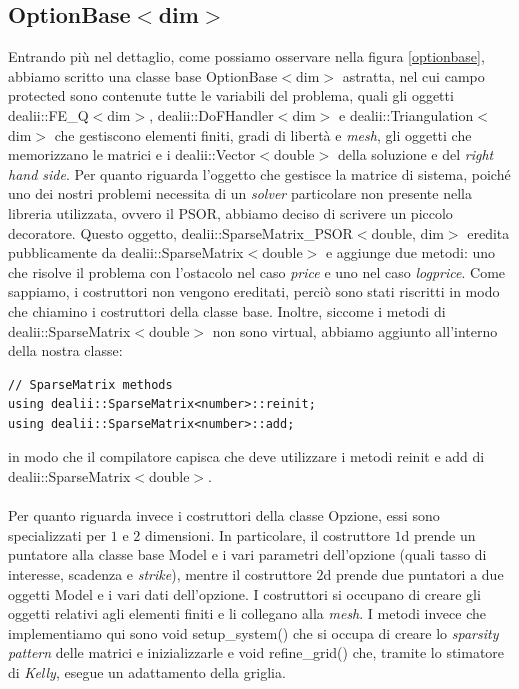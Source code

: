 \documentclass[a4paper,10pt]{report}
\theoremstyle{plain}
\theoremstyle{definition}
\theoremstyle{remark}
\begin{document}
\subsection{\textsf{OptionBase$<$dim$>$}}
Entrando pi\`u nel dettaglio, come possiamo osservare nella figura \ref{optionbase}, abbiamo scritto una classe base \textsf{OptionBase$<$dim$>$} astratta, nel cui campo \textsf{protected} sono contenute tutte le variabili del problema, quali gli oggetti \textsf{dealii::FE\_Q$<$dim$>$}, \textsf{dealii::DoFHandler$<$dim$>$} e \textsf{dealii::Triangulation$<$dim$>$} che gestiscono elementi finiti, gradi di libert\`a e \emph{mesh}, gli oggetti che memorizzano le matrici e i \textsf{dealii::Vector$<$double$>$} della soluzione e del \emph{right hand side}. Per quanto riguarda l'oggetto che gestisce la matrice di sistema, poich\'e uno dei nostri problemi necessita di un \emph{solver} particolare non presente nella libreria utilizzata, ovvero il PSOR, abbiamo deciso di scrivere un piccolo decoratore. Questo oggetto, \textsf{dealii::SparseMatrix\_PSOR$<$double, dim$>$} eredita pubblicamente da \textsf{dealii::SparseMatrix$<$double$>$} e aggiunge due metodi: uno che risolve il problema con l'ostacolo nel caso \emph{price} e uno nel caso \emph{logprice}. Come sappiamo, i costruttori non vengono ereditati, perci\`o sono stati riscritti in modo che chiamino i costruttori della classe base. Inoltre, siccome i metodi di \textsf{dealii::SparseMatrix$<$double$>$} non sono \textsf{virtual}, abbiamo aggiunto all'interno della nostra classe:
\begin{lstlisting}
// SparseMatrix methods
using dealii::SparseMatrix<number>::reinit;
using dealii::SparseMatrix<number>::add;
\end{lstlisting}
in modo che il compilatore capisca che deve utilizzare i metodi \textsf{reinit} e \textsf{add} di \textsf{dealii::SparseMatrix$<$double$>$}.\\\\Per quanto riguarda invece i costruttori della classe Opzione, essi sono specializzati per $1$ e $2$ dimensioni. In particolare, il costruttore $1$d prende un puntatore alla classe base \textsf{Model} e i vari parametri dell'opzione (quali tasso di interesse, scadenza e \emph{strike}), mentre il costruttore $2$d prende due puntatori a due oggetti \textsf{Model} e i vari dati dell'opzione. I costruttori si occupano di creare gli oggetti relativi agli elementi finiti e li collegano alla \emph{mesh}. I metodi invece che implementiamo qui sono \textsf{void setup\_system()} che si occupa di creare lo \emph{sparsity pattern} delle matrici e inizializzarle e \textsf{void refine\_grid()} che, tramite lo stimatore di \emph{Kelly}, esegue un adattamento della griglia.
\end{document}

